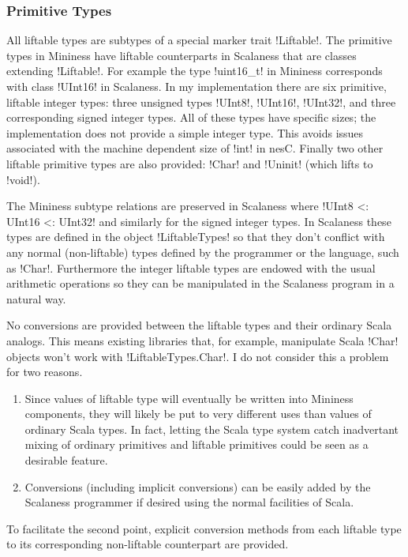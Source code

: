 \subsubsection{Primitive Types}
\label{section-liftable-primitives}

All liftable types are subtypes of a special marker trait !Liftable!. The primitive types in
Mininess have liftable counterparts in Scalaness that are classes extending !Liftable!. For
example the type !uint16\_t! in Mininess corresponds with class !UInt16! in Scalaness. In my
implementation there are six primitive, liftable integer types: three unsigned types !UInt8!,
!UInt16!, !UInt32!, and three corresponding signed integer types. All of these types have
specific sizes; the implementation does not provide a simple integer type. This avoids issues
associated with the machine dependent size of !int! in nesC. Finally two other liftable
primitive types are also provided: !Char! and !Uninit! (which lifts to !void!).

The Mininess subtype relations are preserved in Scalaness where !UInt8 <: UInt16 <: UInt32! and
similarly for the signed integer types. In Scalaness these types are defined in the object
!LiftableTypes! so that they don't conflict with any normal (non-liftable) types defined by the
programmer or the language, such as !Char!. Furthermore the integer liftable types are endowed
with the usual arithmetic operations so they can be manipulated in the Scalaness program in a
natural way.

No conversions are provided between the liftable types and their ordinary Scala analogs. This
means existing libraries that, for example, manipulate Scala !Char! objects won't work with
!LiftableTypes.Char!. I do not consider this a problem for two reasons.
\begin{enumerate}
\item Since values of liftable type will eventually be written into Mininess components, they
  will likely be put to very different uses than values of ordinary Scala types. In fact,
  letting the Scala type system catch inadvertant mixing of ordinary primitives and liftable
  primitives could be seen as a desirable feature.
\item Conversions (including implicit conversions) can be easily added by the Scalaness
  programmer if desired using the normal facilities of Scala.
\end{enumerate}

To facilitate the second point, explicit conversion methods from each liftable type to its
corresponding non-liftable counterpart are provided.

